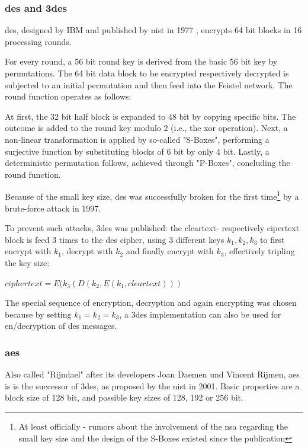 \subsubsection{\gls{des} and \gls{3des}}

\gls{des}, designed by IBM and published by \gls{nist} in 1977 \cite{des}, encrypts 64 bit blocks in 16 processing rounds.

For every round, a 56 bit round key is derived from the basic 56 bit
key by permutations. The 64 bit data block to be encrypted respectively decrypted is subjected to an initial permutation and then feed into the Feistel
network. The round function operates as follows:

At first, the 32 bit half block is expanded to 48 bit by copying specific bits. The outcome is added to the round key modulo 2 (i.e., the \gls{xor} operation).
Next, a non-linear transformation is applied by so-called "S-Boxes", performing a surjective function by substituting blocks of 6 bit by only
4 bit. Lastly, a deterministic permutation follows, achieved through "P-Boxes", concluding the round
function.

Because of the small key size, \gls{des} was successfully broken for the first time\footnote{At least officially - rumors about the involvement of the \gls{nsa}
regarding the small key size and the design of the S-Boxes existed since the publication} by a brute-force attack in 1997.

To prevent such attacks, \gls{3des} was published: the cleartext- respectively 
cipertext block is feed 3 times to the \gls{des} cipher, using 3 different keys $k_1, k_2, k_3$ to first encrypt with $k_1$, decrypt with $k_2$ and finally 
encrypt with $k_3$, effectively tripling the key size:

\begin{center}
 $ciphertext = E(k_3(D(k_2,E(k_1, cleartext)))$
\end{center}

The special sequence of encryption, decryption and again encrypting was chosen because by setting $k_1 = k_2 = k_3$, a \gls{3des} implementation can also be used
for en/decryption of \gls{des} messages.

\subsubsection{\gls{aes}}

Also called "Rijndael" after its developers Joan Daemen und Vincent Rijmen, \gls{aes} is is the successor of \gls{3des}, as
proposed by the \gls{nist} in 2001. Basic properties are a block size of 128 bit, and possible key sizes
of 128, 192 or 256 bit.

